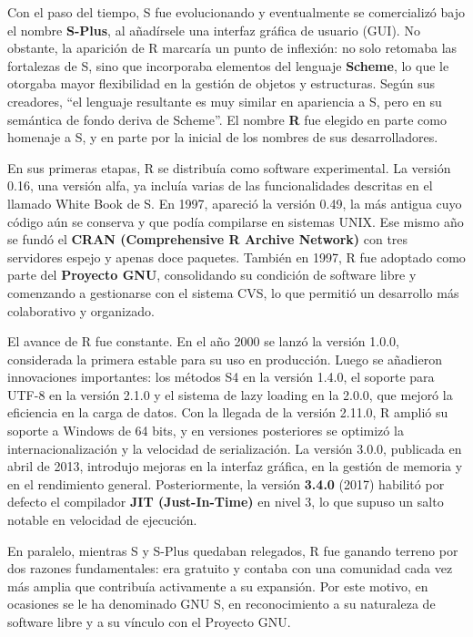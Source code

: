 \documentclass[
  letterpaper,
]{scrbook}
\begin{document}
Con el paso del tiempo, S fue evolucionando y eventualmente se
comercializó bajo el nombre \textbf{S-Plus}, al añadírsele una interfaz
gráfica de usuario (GUI). No obstante, la aparición de R marcaría un
punto de inflexión: no solo retomaba las fortalezas de S, sino que
incorporaba elementos del lenguaje \textbf{Scheme}, lo que le otorgaba
mayor flexibilidad en la gestión de objetos y estructuras. Según sus
creadores, ``el lenguaje resultante es muy similar en apariencia a S,
pero en su semántica de fondo deriva de Scheme''. El nombre \textbf{R}
fue elegido en parte como homenaje a S, y en parte por la inicial de los
nombres de sus desarrolladores.

En sus primeras etapas, R se distribuía como software experimental. La
versión 0.16, una versión alfa, ya incluía varias de las funcionalidades
descritas en el llamado White Book de S. En 1997, apareció la versión
0.49, la más antigua cuyo código aún se conserva y que podía compilarse
en sistemas UNIX. Ese mismo año se fundó el \textbf{CRAN (Comprehensive
R Archive Network)} con tres servidores espejo y apenas doce paquetes.
También en 1997, R fue adoptado como parte del \textbf{Proyecto GNU},
consolidando su condición de software libre y comenzando a gestionarse
con el sistema CVS, lo que permitió un desarrollo más colaborativo y
organizado.

El avance de R fue constante. En el año 2000 se lanzó la versión 1.0.0,
considerada la primera estable para su uso en producción. Luego se
añadieron innovaciones importantes: los métodos S4 en la versión 1.4.0,
el soporte para UTF-8 en la versión 2.1.0 y el sistema de lazy loading
en la 2.0.0, que mejoró la eficiencia en la carga de datos. Con la
llegada de la versión 2.11.0, R amplió su soporte a Windows de 64 bits,
y en versiones posteriores se optimizó la internacionalización y la
velocidad de serialización. La versión 3.0.0, publicada en abril de
2013, introdujo mejoras en la interfaz gráfica, en la gestión de memoria
y en el rendimiento general. Posteriormente, la versión \textbf{3.4.0}
(2017) habilitó por defecto el compilador \textbf{JIT (Just-In-Time)} en
nivel 3, lo que supuso un salto notable en velocidad de ejecución.

En paralelo, mientras S y S-Plus quedaban relegados, R fue ganando
terreno por dos razones fundamentales: era gratuito y contaba con una
comunidad cada vez más amplia que contribuía activamente a su expansión.
Por este motivo, en ocasiones se le ha denominado GNU S, en
reconocimiento a su naturaleza de software libre y a su vínculo con el
Proyecto GNU.
\end{document}
